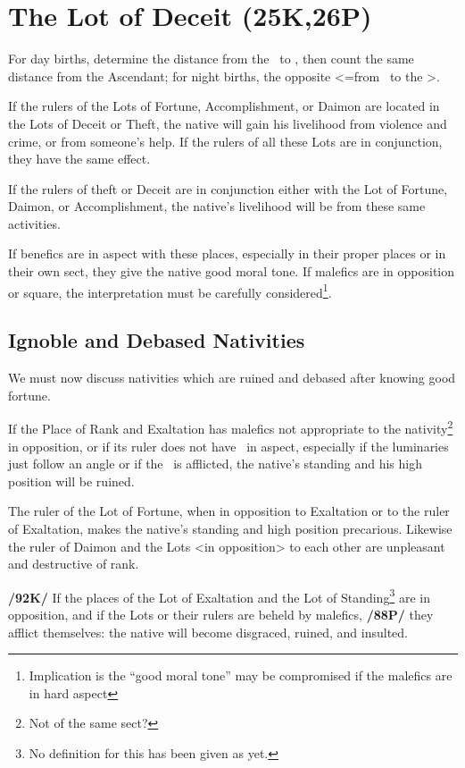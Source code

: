 \section{The Lot of Deceit (25K,26P)}

For day births, determine the distance from the \Sun\, to \Mars, then count the same distance from the Ascendant; for night births, the opposite <=from \Mars\, to the \Sun>. 

If the rulers of the Lots of Fortune, Accomplishment, or Daimon are located in the Lots of Deceit or Theft, the native will gain his livelihood from violence and crime, or from someone’s help. If the rulers of all these Lots are in conjunction, they
have the same effect. 

If the rulers of theft or Deceit are in conjunction either with the Lot of Fortune, Daimon, or Accomplishment, the native’s livelihood will be from these same activities. 

If benefics are in aspect with these places, especially in their proper places or in their own sect, they give the native good moral tone. \mndl If malefics are in opposition or square, the interpretation must be carefully considered\footnote{Implication is the ``good moral tone'' may be compromised if the malefics are in hard aspect}.

\subsection{\textlangle Ignoble and Debased Nativities\textrangle}
We must now discuss nativities which are ruined and debased after knowing good fortune. 

If the Place of Rank and Exaltation has malefics not appropriate to the nativity\footnote{Not of the same sect?} in opposition, or if its ruler does not have \Jupiter\, in aspect, especially if the luminaries just follow an angle or if the \Moon\, is afflicted, the native’s standing and his high position will be ruined. 

The ruler of the Lot of Fortune, when in opposition to Exaltation or to the ruler of Exaltation, makes the native’s standing and high position precarious. Likewise the ruler of Daimon and the Lots <in opposition> to each other are unpleasant and destructive of rank.

\textbf{/92K/} If the places of the Lot of Exaltation and the Lot of Standing\footnote{No definition for this has been given as yet.} are in opposition, and if the Lots or
their rulers are beheld by malefics, \textbf{/88P/} they afflict themselves: the native will become disgraced, ruined, and insulted. 

